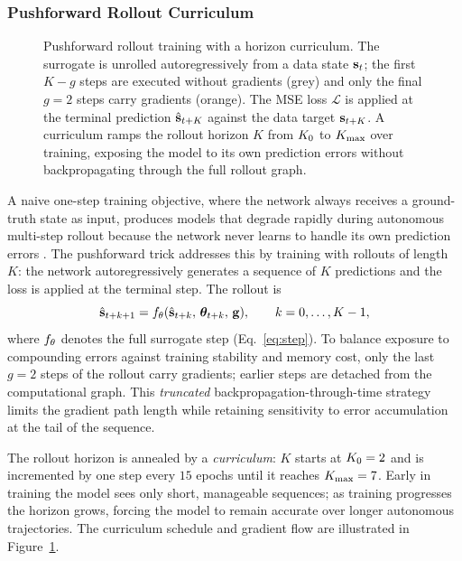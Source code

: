 \subsubsection{Pushforward Rollout Curriculum}
\label{sec:curriculum}

\begin{figure}[t]
  \centering
  
  \caption{Pushforward rollout training with a horizon curriculum. The surrogate
    is unrolled autoregressively from a data state $\mathbf{s}_t$; the first
    $K-g$ steps are executed without gradients (grey) and only the final
    $g=2$ steps carry gradients (orange). The MSE loss $\mathcal{L}$ is applied
    at the terminal prediction $\hat{\mathbf{s}}_{t+K}$ against the data target
    $\mathbf{s}_{t+K}$. A curriculum ramps the rollout horizon $K$ from $K_0$ to
    $K_{\max}$ over training, exposing the model to its own prediction errors
    without backpropagating through the full rollout graph.}
  \label{fig:pushforward}
\end{figure}

A naive one-step training objective, where the network always receives a
ground-truth state as input, produces models that degrade rapidly during
autonomous multi-step rollout because the network never learns to handle its
own prediction errors \cite{brandstetter2022}. The pushforward trick addresses
this by training with rollouts of length $K$: the network autoregressively
generates a sequence of $K$ predictions and the loss is applied at the terminal
step. The rollout is
\begin{equation}
  \hat{\mathbf{s}}_{t+k+1}
    = f_\theta(\hat{\mathbf{s}}_{t+k},\,\boldsymbol{\theta}_{t+k},\,\mathbf{g}),
  \qquad k = 0, \ldots, K-1,
  \label{eq:rollout}
\end{equation}
where $f_\theta$ denotes the full surrogate step (Eq.~\ref{eq:step}). To
balance exposure to compounding errors against training stability and memory
cost, only the last $g=2$ steps of the rollout carry gradients; earlier
steps are detached from the computational graph. This \emph{truncated}
backpropagation-through-time strategy limits the gradient path length while
retaining sensitivity to error accumulation at the tail of the sequence.

The rollout horizon is annealed by a \emph{curriculum}: $K$ starts at
$K_0 = 2$ and is incremented by one step every $15$ epochs until it reaches
$K_{\max} = 7$. Early in training the model sees only short, manageable
sequences; as training progresses the horizon grows, forcing the model to
remain accurate over longer autonomous trajectories. The curriculum schedule
and gradient flow are illustrated in Figure~\ref{fig:pushforward}.


